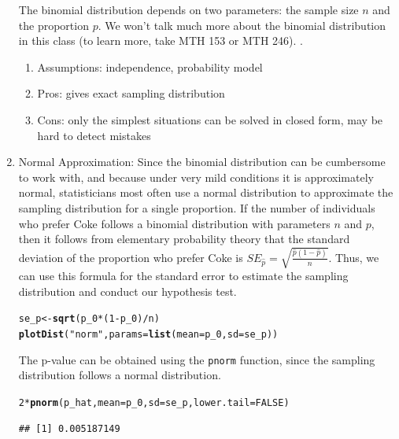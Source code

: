 \documentclass[10pt]{article}\usepackage[]{graphicx}\usepackage[]{color}
\makeatletter
\newcommand{\hlnum}[1]{\textcolor[rgb]{0.686,0.059,0.569}{#1}}%
\newcommand{\hlstr}[1]{\textcolor[rgb]{0.192,0.494,0.8}{#1}}%
\newcommand{\hlopt}[1]{\textcolor[rgb]{0,0,0}{#1}}%
\newcommand{\hlstd}[1]{\textcolor[rgb]{0.345,0.345,0.345}{#1}}%
\newcommand{\hlkwb}[1]{\textcolor[rgb]{0.69,0.353,0.396}{#1}}%
\newcommand{\hlkwc}[1]{\textcolor[rgb]{0.333,0.667,0.333}{#1}}%
\newcommand{\hlkwd}[1]{\textcolor[rgb]{0.737,0.353,0.396}{\textbf{#1}}}%
\newenvironment{kframe}{%
 \def\at@end@of@kframe{}%
 \ifinner\ifhmode%
  \def\at@end@of@kframe{\end{minipage}}%
  \begin{minipage}{\columnwidth}%
 \fi\fi%
 \def\FrameCommand##1{\hskip\@totalleftmargin \hskip-\fboxsep
 \colorbox{shadecolor}{##1}\hskip-\fboxsep
     \hskip-\linewidth \hskip-\@totalleftmargin \hskip\columnwidth}%
 \MakeFramed {\advance\hsize-\width
   \@totalleftmargin\z@ \linewidth\hsize
   \@setminipage}}%
 {\par\unskip\endMakeFramed%
 \at@end@of@kframe}
\newenvironment{knitrout}{}{} %
\newcommand{\cmd}[1]{\texttt{#1}}
\makeatother
\begin{document}
\begin{enumerate}
The binomial distribution depends on two parameters: the sample size $n$ and the proportion $p$. We won't talk much more about the binomial distribution in this class (to learn more, take MTH 153 or MTH 246). 
.
  \begin{enumerate}
    \item Assumptions: independence, probability model
    \item Pros: gives exact sampling distribution
    \item Cons: only the simplest situations can be solved in closed form, may be hard to detect mistakes
  \end{enumerate}
  
\clearpage
\item Normal Approximation: Since the binomial distribution can be cumbersome to work with, and because under very mild conditions it is approximately normal, statisticians most often use a normal distribution to approximate the sampling distribution for a single proportion. If the number of individuals who prefer Coke follows a binomial distribution with parameters $n$ and $p$, then it follows from elementary probability theory that the standard deviation of the proportion who prefer Coke is $SE_{\hat{p}} = \sqrt{\frac{\hat{p}(1-\hat{p})}{n}}$. Thus, we can use this formula for the standard error to estimate the sampling distribution and conduct our hypothesis test.
  
\begin{knitrout}
\color{fgcolor}\begin{kframe}
\begin{alltt}
\hlstd{se_p} \hlkwb{<-} \hlkwd{sqrt}\hlstd{(p_0} \hlopt{*} \hlstd{(}\hlnum{1}\hlopt{-}\hlstd{p_0)} \hlopt{/} \hlstd{n)}
\hlkwd{plotDist}\hlstd{(}\hlstr{"norm"}\hlstd{,} \hlkwc{params} \hlstd{=} \hlkwd{list}\hlstd{(}\hlkwc{mean} \hlstd{= p_0,} \hlkwc{sd} \hlstd{= se_p))}
\end{alltt}
\end{kframe}
\end{knitrout}

  The p-value can be obtained using the \cmd{pnorm} function, since the sampling distribution follows a normal distribution.

\begin{knitrout}
\color{fgcolor}\begin{kframe}
\begin{alltt}
\hlnum{2} \hlopt{*} \hlkwd{pnorm}\hlstd{(p_hat,} \hlkwc{mean} \hlstd{= p_0,} \hlkwc{sd} \hlstd{= se_p,} \hlkwc{lower.tail} \hlstd{=} \hlnum{FALSE}\hlstd{)}
\end{alltt}
\begin{verbatim}
## [1] 0.005187149
\end{verbatim}
\end{kframe}
\end{knitrout}


\end{enumerate}
\end{document}
